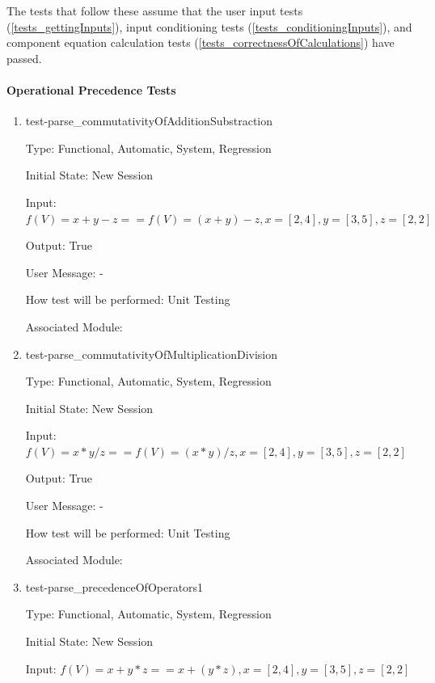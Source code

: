 \documentclass[12pt, titlepage]{article}
\begin{document}

The tests that follow these assume that the user input tests 
(\ref{tests_gettingInputs}), input conditioning tests 
(\ref{tests_conditioningInputs}), and component equation calculation tests 
(\ref{tests_correctnessOfCalculations}) have passed.

\paragraph{Operational Precedence Tests}

\begin{enumerate}
	
	\item{test-parse\_commutativityOfAdditionSubstraction}
	
	Type: Functional, Automatic, System, Regression
	
	Initial State: New Session
	
	Input: $f(V) = x + y - z == f(V) = (x + y) - z, x = [2,4], y = [3,5], z = 
	[2,2]$
	
	Output: True
	
	User Message: - 
	
	How test will be performed: Unit Testing
	
	Associated Module: \\
	
	\item{test-parse\_commutativityOfMultiplicationDivision}
	
	Type: Functional, Automatic, System, Regression
	
	Initial State: New Session
	
	Input: $f(V) = x * y / z == f(V) = (x * y) / z, x = [2,4], y = [3,5], z = 
	[2,2]$
	
	Output: True
	
	User Message: - 
	
	How test will be performed: Unit Testing
	
	Associated Module: \\
	
	\item{test-parse\_precedenceOfOperators1}
	
	Type: Functional, Automatic, System, Regression
	
	Initial State: New Session
	
	Input: $f(V) = x + y * z == x + (y * z), x = [2,4], y = [3,5], z = [2,2]$
	

\end{enumerate}
\end{document}
